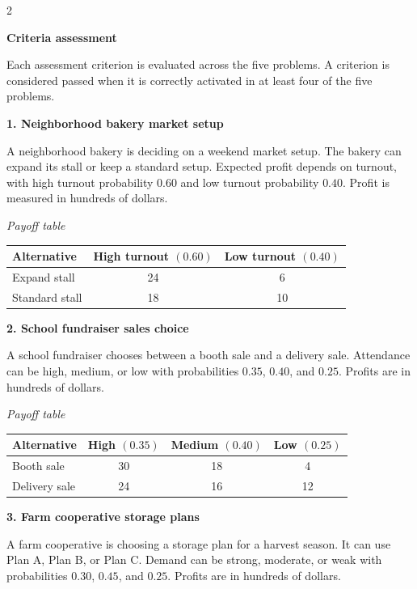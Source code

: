 \documentclass[12pt]{article}
\newcommand{\SubsectionBox}[1]{%
	\noindent\colorbox{gray!30}{%
		\parbox{\linewidth}{\textbf{#1}}%
	}\par\vspace{0.35cm}%
}
\begin{document}
	\begin{multicols}{2}
		\SubsectionBox{Criteria assessment}\vspace{-0.25cm}
		Each assessment criterion is evaluated across the five problems. A criterion is considered passed when it is correctly activated in at least four of the five problems.

		\vspace{0.25cm}
		\SubsectionBox{1. Neighborhood bakery market setup}\vspace{-0.25cm}
		A neighborhood bakery is deciding on a weekend market setup. The bakery can expand its stall or keep a standard setup. Expected profit depends on turnout, with high turnout probability $0.60$ and low turnout probability $0.40$. Profit is measured in hundreds of dollars.

		\begin{center}
			\textit{Payoff table}\\
			\begin{tabular}{|l|c|c|}
				\hline
				Alternative & High turnout $(0.60)$ & Low turnout $(0.40)$ \\
				\hline
				Expand stall & 24 & 6 \\
				Standard stall & 18 & 10 \\
				\hline
			\end{tabular}
		\end{center}

		\vspace{0.25cm}
		\SubsectionBox{2. School fundraiser sales choice}\vspace{-0.25cm}
		A school fundraiser chooses between a booth sale and a delivery sale. Attendance can be high, medium, or low with probabilities $0.35$, $0.40$, and $0.25$. Profits are in hundreds of dollars.

		\begin{center}
			\textit{Payoff table}\\
			\begin{tabular}{|l|c|c|c|}
				\hline
				Alternative & High $(0.35)$ & Medium $(0.40)$ & Low $(0.25)$ \\
				\hline
				Booth sale & 30 & 18 & 4 \\
				Delivery sale & 24 & 16 & 12 \\
				\hline
			\end{tabular}
		\end{center}

		\vspace{0.25cm}
		\SubsectionBox{3. Farm cooperative storage plans}\vspace{-0.25cm}
		A farm cooperative is choosing a storage plan for a harvest season. It can use Plan A, Plan B, or Plan C. Demand can be strong, moderate, or weak with probabilities $0.30$, $0.45$, and $0.25$. Profits are in hundreds of dollars.


\end{multicols}
\end{document}
